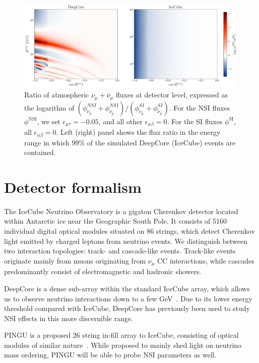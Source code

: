 \documentclass{revtex4-2}
\newcommand{\emt}{\ensuremath{\epsilon_{\mu\tau}}}
\newcommand{\nm}{\nu_\mu}
\begin{document}
\begin{figure}[!tb] %
   \begin{center}
      \includegraphics[width=0.99\linewidth]{figures/flux_ratio.pdf}
   \end{center}
   \caption{Ratio of atmospheric $\nu_\mu + \bar{\nu}_\mu$ fluxes at detector level, expressed as the logarithm of $(\phi_{\nu_\mu}^{NSI} + \phi_{\bar\nu_\mu}^{NSI})/(\phi_{\nu_\mu}^{SI} + \phi_{\bar\nu_\mu}^{SI})$.
   For the NSI fluxes $\phi^\text{NSI}$, we set $\emt = -0.05$, and all other $\epsilon_{\alpha\beta}=0$. For the SI fluxes $\phi^\text{SI}$, all $\epsilon_{\alpha\beta} = 0$.
   Left (right) panel shows the flux ratio in the energy range in which 99\% of the simulated DeepCore (IceCube) events are contained.
   }\label{fig:flux_ratio}
\end{figure}

\section{Detector formalism} %
The IceCube Neutrino Observatory is a gigaton Cherenkov detector located within Antarctic ice near the Geographic 
South Pole. It consists of 5160 individual digital optical modules situated on 86 strings, which detect Cherenkov light emitted by charged leptons
from neutrino events. We distinguish between two interaction topologies: track- and cascade-like events. Track-like events originate mainly
from muons originating from $\nm$ CC interactions, while cascades predominantly consist of electromagnetic and hadronic showers. 

DeepCore is a dense sub-array within the standard IceCube array, which allows us to observe neutrino interactions down to a few GeV~\cite{DC2021}.
Due to its lower energy threshold compared with IceCube, DeepCore has previously been used to study NSI effects in this more discernible range\cite{DC2021,deepcoreNSI}.

PINGU is a proposed 26 string in-fill array to IceCube, consisting of optical modules of similar nature~\cite{PINGUletter}. While proposed to mainly shed light on 
neutrino mass ordering, PINGU will be able to probe NSI parameters as well.  
\end{document}

